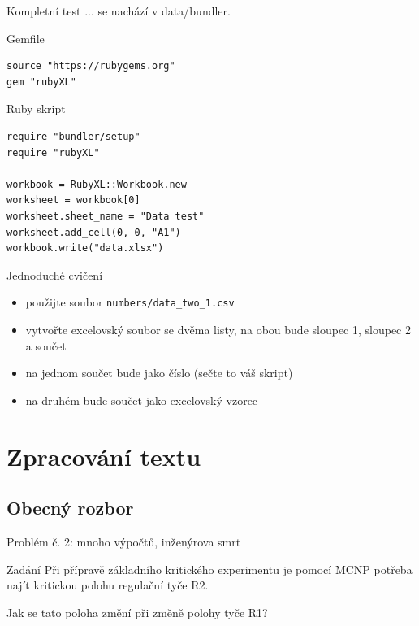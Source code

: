 \documentclass{beamer}
\begin{document}
\begin{frame}[fragile]{Kompletní test}
  ... se nachází v data/bundler.
  \begin{block}{Gemfile}
  {\scriptsize
  \begin{verbatim}
source "https://rubygems.org"
gem "rubyXL"
  \end{verbatim}
  }
  \end{block}
  \begin{block}{Ruby skript}
  {\scriptsize
  \begin{verbatim}
require "bundler/setup"
require "rubyXL"

workbook = RubyXL::Workbook.new
worksheet = workbook[0]
worksheet.sheet_name = "Data test"
worksheet.add_cell(0, 0, "A1")
workbook.write("data.xlsx")
  \end{verbatim}
  }
  \end{block}
\end{frame}

\begin{frame}{Jednoduché cvičení}
  \begin{itemize}
    \item použijte soubor \texttt{numbers/data\_two\_1.csv}
    \item vytvořte excelovský soubor se dvěma listy, na obou bude sloupec 1, sloupec 2 a součet
    \item na jednom součet bude jako číslo (sečte to váš skript)
    \item na druhém bude součet jako excelovský vzorec
  \end{itemize}
\end{frame}

\section{Zpracování textu}

\subsection{Obecný rozbor}

\begin{frame}{Problém č. 2: mnoho výpočtů, inženýrova smrt}
  \begin{block}{Zadání}
    Při přípravě základního kritického experimentu je pomocí MCNP potřeba najít kritickou polohu regulační tyče R2.

    Jak se tato poloha změní při změně polohy tyče R1?
  \end{block}
\end{frame}
\end{document}
